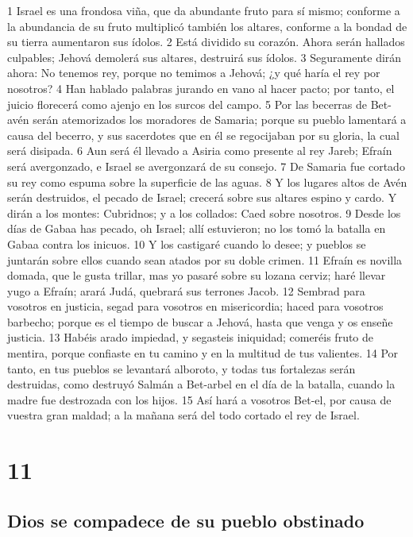 1 Israel es una frondosa viña, que da abundante fruto para sí mismo; conforme a la abundancia de su fruto multiplicó también los altares, conforme a la bondad de su tierra aumentaron sus ídolos.
2 Está dividido su corazón. Ahora serán hallados culpables; Jehová demolerá sus altares, destruirá sus ídolos.
3 Seguramente dirán ahora: No tenemos rey, porque no temimos a Jehová; ¿y qué haría el rey por nosotros?
4 Han hablado palabras jurando en vano al hacer pacto; por tanto, el juicio florecerá como ajenjo en los surcos del campo.
5 Por las becerras de Bet-avén serán atemorizados los moradores de Samaria; porque su pueblo lamentará a causa del becerro, y sus sacerdotes que en él se regocijaban por su gloria, la cual será disipada.
6 Aun será él llevado a Asiria como presente al rey Jareb; Efraín será avergonzado, e Israel se avergonzará de su consejo.
7 De Samaria fue cortado su rey como espuma sobre la superficie de las aguas.
8 Y los lugares altos de Avén serán destruidos, el pecado de Israel; crecerá sobre sus altares espino y cardo. Y dirán a los montes: Cubridnos; y a los collados: Caed sobre nosotros. 
9 Desde los días de Gabaa has pecado, oh Israel; allí estuvieron; no los tomó la batalla en Gabaa contra los inicuos.
10 Y los castigaré cuando lo desee; y pueblos se juntarán sobre ellos cuando sean atados por su doble crimen.
11 Efraín es novilla domada, que le gusta trillar, mas yo pasaré sobre su lozana cerviz; haré llevar yugo a Efraín; arará Judá, quebrará sus terrones Jacob.
12 Sembrad para vosotros en justicia, segad para vosotros en misericordia; haced para vosotros barbecho; porque es el tiempo de buscar a Jehová, hasta que venga y os enseñe justicia.
13 Habéis arado impiedad, y segasteis iniquidad; comeréis fruto de mentira, porque confiaste en tu camino y en la multitud de tus valientes.
14 Por tanto, en tus pueblos se levantará alboroto, y todas tus fortalezas serán destruidas, como destruyó Salmán a Bet-arbel en el día de la batalla, cuando la madre fue destrozada con los hijos.
15 Así hará a vosotros Bet-el, por causa de vuestra gran maldad; a la mañana será del todo cortado el rey de Israel.

\chapter{11}

\section*{Dios se compadece de su pueblo obstinado}


